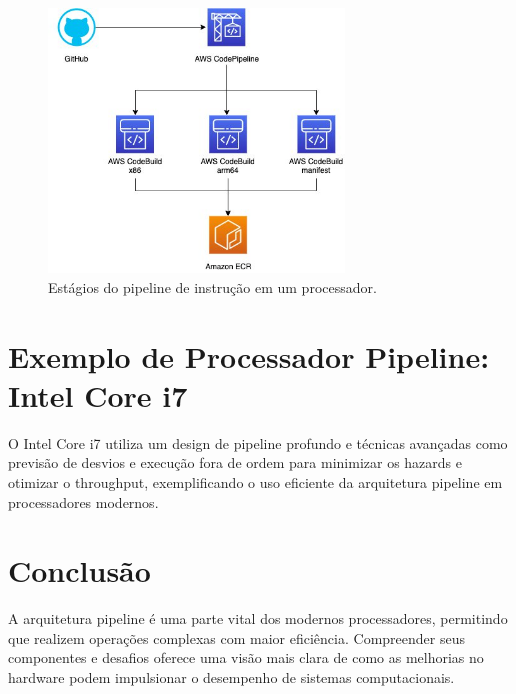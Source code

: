 \documentclass[12pt]{article}
\begin{document}
\begin{figure}[h]
\centering
\includegraphics[width=0.7\textwidth]{fig4.jpg}
\caption{Estágios do pipeline de instrução em um processador.}
\label{fig:pipeline_instrucao}
\end{figure}


\section*{Exemplo de Processador Pipeline: Intel Core i7}

O Intel Core i7 utiliza um design de pipeline profundo e técnicas avançadas como previsão de desvios e execução fora de ordem para minimizar os hazards e otimizar o throughput, exemplificando o uso eficiente da arquitetura pipeline em processadores modernos.

\section*{Conclusão}

A arquitetura pipeline é uma parte vital dos modernos processadores, permitindo que realizem operações complexas com maior eficiência. Compreender seus componentes e desafios oferece uma visão mais clara de como as melhorias no hardware podem impulsionar o desempenho de sistemas computacionais.
\end{document}
